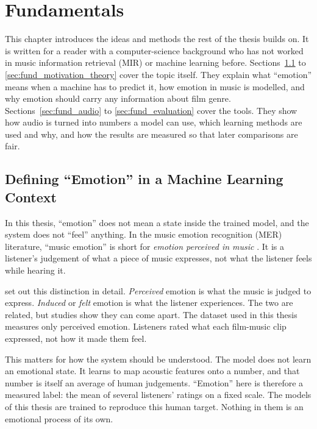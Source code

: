 \chapter{Fundamentals}
\label{ch:fundamentals}

This chapter introduces the ideas and methods the rest of the thesis builds on. It is written for a reader with a computer-science background who has not worked in music information retrieval (MIR) or machine learning before. Sections~\ref{sec:fund_emotion_def} to \ref{sec:fund_motivation_theory} cover the topic itself. They explain what ``emotion'' means when a machine has to predict it, how emotion in music is modelled, and why emotion should carry any information about film genre. Sections~\ref{sec:fund_audio} to \ref{sec:fund_evaluation} cover the tools. They show how audio is turned into numbers a model can use, which learning methods are used and why, and how the results are measured so that later comparisons are fair.

\section{Defining ``Emotion'' in a Machine Learning Context}
\label{sec:fund_emotion_def}

In this thesis, ``emotion'' does not mean a state inside the trained model, and the system does not ``feel'' anything. In the music emotion recognition (MER) literature, ``music emotion'' is short for \emph{emotion perceived in music} \citep{yang2012machine}. It is a listener's judgement of what a piece of music expresses, not what the listener feels while hearing it.

\citet{gabrielsson2002emotion} set out this distinction in detail. \emph{Perceived} emotion is what the music is judged to express. \emph{Induced} or \emph{felt} emotion is what the listener experiences. The two are related, but studies show they can come apart. The dataset used in this thesis \citep{eerola2011comparison} measures only perceived emotion. Listeners rated what each film-music clip expressed, not how it made them feel.

This matters for how the system should be understood. The model does not learn an emotional state. It learns to map acoustic features onto a number, and that number is itself an average of human judgements. ``Emotion'' here is therefore a measured label: the mean of several listeners' ratings on a fixed scale. The models of this thesis are trained to reproduce this human target. Nothing in them is an emotional process of its own.

